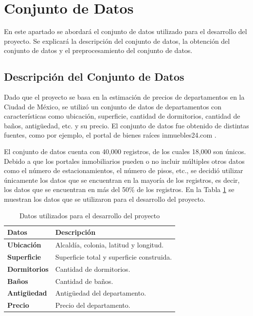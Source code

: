 \section{Conjunto de Datos}

En este apartado se abordará el conjunto de datos utilizado para el desarrollo
del proyecto. Se explicará la descripción del conjunto de datos, la obtención
del conjunto de datos y el preprocesamiento del conjunto de datos.

\subsection{Descripción del Conjunto de Datos}

Dado que el proyecto se basa en la estimación de precios de departamentos en
la Ciudad de México, se utilizó un conjunto de datos de departamentos con
características como ubicación, superficie, cantidad de dormitorios, cantidad
de baños, antigüedad, etc. y su precio. El conjunto de datos fue obtenido de
distintas fuentes, como por ejemplo, el portal de bienes raíces inmuebles24.com
\cite{inmuebles24url}.

El conjunto de datos cuenta con 40,000 registros, de los cuales 18,000 son únicos.
Debido a que los portales inmobiliarios pueden o no incluir múltiples otros
datos como el número de estacionamientos, el número de pisos, etc., se decidió
utilizar únicamente los datos que se encuentran en la mayoría de los registros,
es decir, los datos que se encuentran en más del 50\% de los registros. En la
Tabla \ref{tab:datos} se muestran los datos que se utilizaron para el desarrollo
del proyecto.

\begin{table}[H]
    \centering
    \begin{tabular}{|p{}|p{}|}
        \hline
        \rowcolor{azulclaro}
        \centering\textbf{Datos} & \centering\textbf{Descripción}\arraybackslash \\
        \hline
        \textbf{Ubicación} & Alcaldía, colonia, latitud y longitud. \\
        \hline
        \textbf{Superficie} & Superficie total y superficie construida. \\
        \hline
        \textbf{Dormitorios} & Cantidad de dormitorios. \\
        \hline
        \textbf{Baños} & Cantidad de baños. \\
        \hline
        \textbf{Antigüedad} & Antigüedad del departamento. \\
        \hline
        \textbf{Precio} & Precio del departamento. \\
        \hline
    \end{tabular}
    \caption{Datos utilizados para el desarrollo del proyecto}
    \label{tab:datos}
\end{table}

